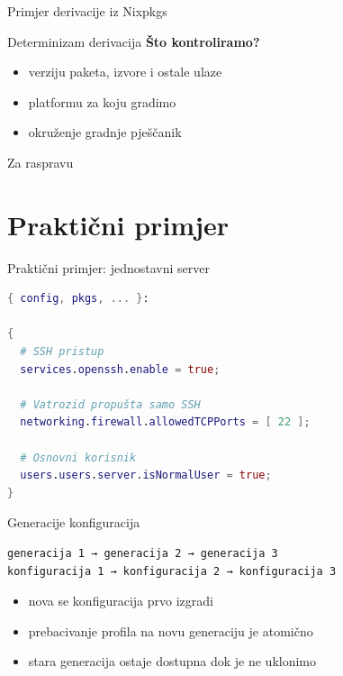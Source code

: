 \documentclass{beamer}
\begin{document}
\begin{frame}{Primjer derivacije iz Nixpkgs}
\end{frame}

\begin{frame}{Determinizam derivacija}
	\textbf{Što kontroliramo?}
	\begin{itemize}
		\item verziju paketa, izvore i ostale ulaze
		\item platformu za koju gradimo
		\item okruženje gradnje \textrightarrow{} pješčanik
	\end{itemize}
\end{frame}

\begin{frame}{Za raspravu}
\end{frame}

\section{Praktični primjer}

\begin{frame}[fragile]{Praktični primjer: jednostavni server}
	\begin{lstlisting}[language=nix]
{ config, pkgs, ... }:

{
  # SSH pristup
  services.openssh.enable = true;

  # Vatrozid propušta samo SSH
  networking.firewall.allowedTCPPorts = [ 22 ];

  # Osnovni korisnik
  users.users.server.isNormalUser = true;
}
\end{lstlisting}
\end{frame}

\begin{frame}[fragile]{Generacije konfiguracija}
	\begin{lstlisting}
generacija 1 → generacija 2 → generacija 3
konfiguracija 1 → konfiguracija 2 → konfiguracija 3
\end{lstlisting}


	\begin{itemize}
		\item nova se konfiguracija prvo izgradi
		\item prebacivanje profila na novu generaciju je atomično
		\item stara generacija ostaje dostupna dok je ne uklonimo
	\end{itemize}
\end{frame}
\end{document}
